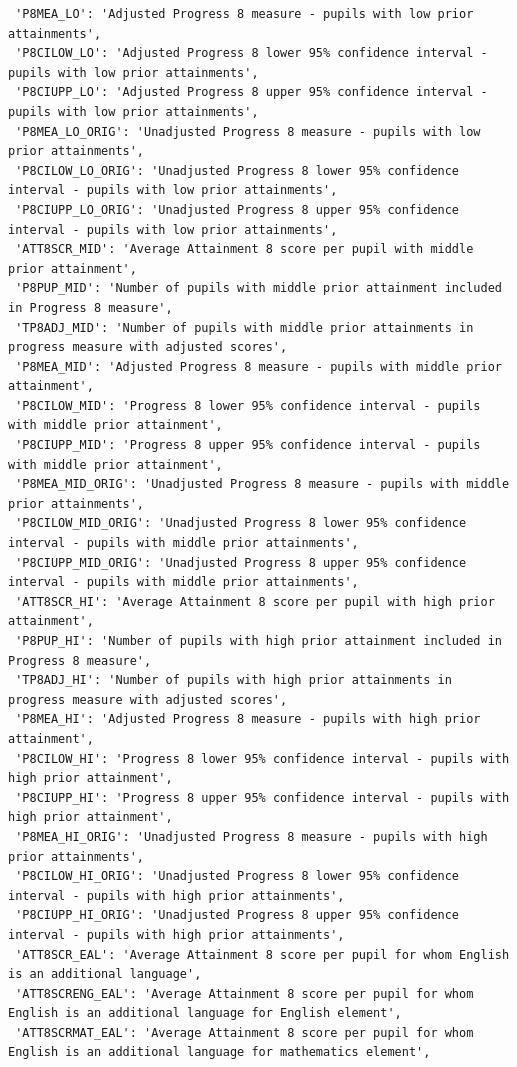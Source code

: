 \documentclass[
  letterpaper,
  DIV=11,
  numbers=noendperiod]{scrartcl}
\begin{document}
\begin{verbatim}
 'P8MEA_LO': 'Adjusted Progress 8 measure - pupils with low prior attainments',
 'P8CILOW_LO': 'Adjusted Progress 8 lower 95% confidence interval - pupils with low prior attainments',
 'P8CIUPP_LO': 'Adjusted Progress 8 upper 95% confidence interval - pupils with low prior attainments',
 'P8MEA_LO_ORIG': 'Unadjusted Progress 8 measure - pupils with low prior attainments',
 'P8CILOW_LO_ORIG': 'Unadjusted Progress 8 lower 95% confidence interval - pupils with low prior attainments',
 'P8CIUPP_LO_ORIG': 'Unadjusted Progress 8 upper 95% confidence interval - pupils with low prior attainments',
 'ATT8SCR_MID': 'Average Attainment 8 score per pupil with middle prior attainment',
 'P8PUP_MID': 'Number of pupils with middle prior attainment included in Progress 8 measure',
 'TP8ADJ_MID': 'Number of pupils with middle prior attainments in progress measure with adjusted scores',
 'P8MEA_MID': 'Adjusted Progress 8 measure - pupils with middle prior attainment',
 'P8CILOW_MID': 'Progress 8 lower 95% confidence interval - pupils with middle prior attainment',
 'P8CIUPP_MID': 'Progress 8 upper 95% confidence interval - pupils with middle prior attainment',
 'P8MEA_MID_ORIG': 'Unadjusted Progress 8 measure - pupils with middle prior attainments',
 'P8CILOW_MID_ORIG': 'Unadjusted Progress 8 lower 95% confidence interval - pupils with middle prior attainments',
 'P8CIUPP_MID_ORIG': 'Unadjusted Progress 8 upper 95% confidence interval - pupils with middle prior attainments',
 'ATT8SCR_HI': 'Average Attainment 8 score per pupil with high prior attainment',
 'P8PUP_HI': 'Number of pupils with high prior attainment included in Progress 8 measure',
 'TP8ADJ_HI': 'Number of pupils with high prior attainments in progress measure with adjusted scores',
 'P8MEA_HI': 'Adjusted Progress 8 measure - pupils with high prior attainment',
 'P8CILOW_HI': 'Progress 8 lower 95% confidence interval - pupils with high prior attainment',
 'P8CIUPP_HI': 'Progress 8 upper 95% confidence interval - pupils with high prior attainment',
 'P8MEA_HI_ORIG': 'Unadjusted Progress 8 measure - pupils with high prior attainments',
 'P8CILOW_HI_ORIG': 'Unadjusted Progress 8 lower 95% confidence interval - pupils with high prior attainments',
 'P8CIUPP_HI_ORIG': 'Unadjusted Progress 8 upper 95% confidence interval - pupils with high prior attainments',
 'ATT8SCR_EAL': 'Average Attainment 8 score per pupil for whom English is an additional language',
 'ATT8SCRENG_EAL': 'Average Attainment 8 score per pupil for whom English is an additional language for English element',
 'ATT8SCRMAT_EAL': 'Average Attainment 8 score per pupil for whom English is an additional language for mathematics element',

\end{verbatim}
\end{document}
